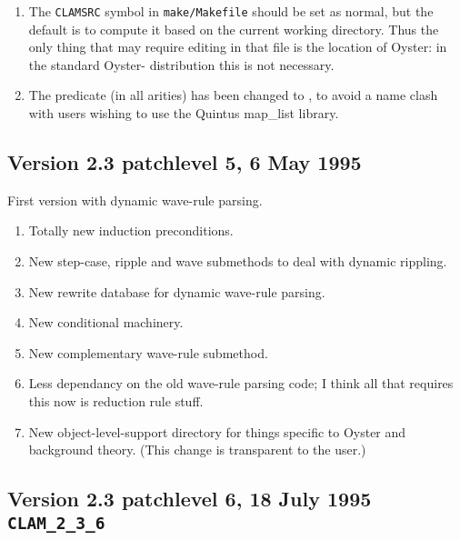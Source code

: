 \begin{enumerate}
\item The \verb|CLAMSRC| symbol in \verb|make/Makefile| should
be set as normal, but the default is to compute it based on the
current working directory.  Thus the only thing that may require
editing in that file is the location of Oyster: in the standard
Oyster-\clam{} distribution this is not necessary.

  \item The predicate  (in all arities) has been changed to
, to avoid a name clash with users wishing to use the
Quintus map\_list library.

\end{enumerate}

\subsection {Version 2.3  patchlevel 5, 6 May 1995}
First version with dynamic wave-rule parsing.

\begin{enumerate}
\item Totally new induction preconditions.
\item New step-case, ripple and wave submethods to deal with dynamic
rippling. 
\item New rewrite database for dynamic wave-rule parsing.
\item New conditional machinery.
\item New complementary wave-rule submethod.
\item Less dependancy on the old wave-rule parsing code;  I think
          all that requires this now is reduction rule stuff.
\item New object-level-support directory for things specific to Oyster and
        background theory.  (This change is transparent to the user.)
\end{enumerate}

\subsection {Version 2.3 patchlevel 6, 18 July 1995 {\tt CLAM\_2\_3\_6}}

